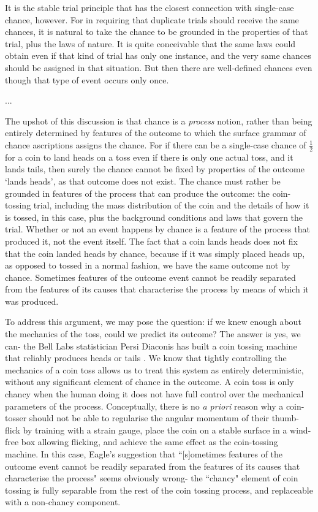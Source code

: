 \documentclass{ut-thesis}
\begin{document}
\begin{NoHyper}
\begin{longquote}
It is the stable trial principle that has the closest connection with single-case chance, however. For in requiring that duplicate trials should receive the same chances, it is natural to take the chance to be grounded in the properties of that trial, plus the laws of nature. It is quite conceivable that the same laws could obtain even if that kind of trial has only one instance, and the very same chances should be assigned in that situation. But then there are well-defined chances even though that type of event occurs only once.

...

The upshot of this discussion is that chance is a \textit{process} notion, rather than being entirely determined by features of the outcome to which the surface grammar of chance ascriptions assigns the chance. For if there can be a single-case chance of $\frac{1}{2}$
for a coin to land heads on a toss even if there is only one actual toss, and it lands tails, then surely the chance cannot be fixed by properties of the outcome ‘lands heads’, as that outcome does not exist. The chance must rather be grounded in features of the process that can produce the outcome: the coin-tossing trial, including the mass distribution of the coin and the details of how it is tossed, in this case, plus the background conditions and laws that govern the trial. Whether or not an event happens by chance is a feature of the process that produced it, not the event itself. The fact that a coin lands heads does not fix that the coin landed heads by chance, because if it was simply placed heads up, as opposed to tossed in a normal fashion, we have the same outcome not by chance. Sometimes features of the outcome event cannot be readily separated from the features of its causes that characterise the process by means of which it was produced. 

\cite{Eagle2018}
\end{longquote}

To address this argument, we may pose the question: if we knew enough about the mechanics of the toss, could we predict its outcome? The answer is yes, we can- the Bell Labs statistician Persi Diaconis has built a coin tossing machine that reliably produces heads or tails \cite{Kestenbaum2004}. We know that tightly controlling the mechanics of a coin toss allows us to treat this system as entirely deterministic, without any significant element of chance in the outcome. A coin toss is only chancy when the human doing it does not have full control over the mechanical parameters of the process. Conceptually, there is no \textit{a priori} reason why a coin-tosser should not be able to regularise the angular momentum of their thumb-flick by training with a strain gauge, place the coin on a stable surface in a wind-free box allowing flicking, and achieve the same effect as the coin-tossing machine. In this case, Eagle's suggestion that ``[s]ometimes features of the outcome event cannot be readily separated from the features of its causes that characterise the process" seems obviously wrong- the ``chancy" element of coin tossing is fully separable from the rest of the coin tossing process, and replaceable with a non-chancy component.


\end{NoHyper}
\end{document}
